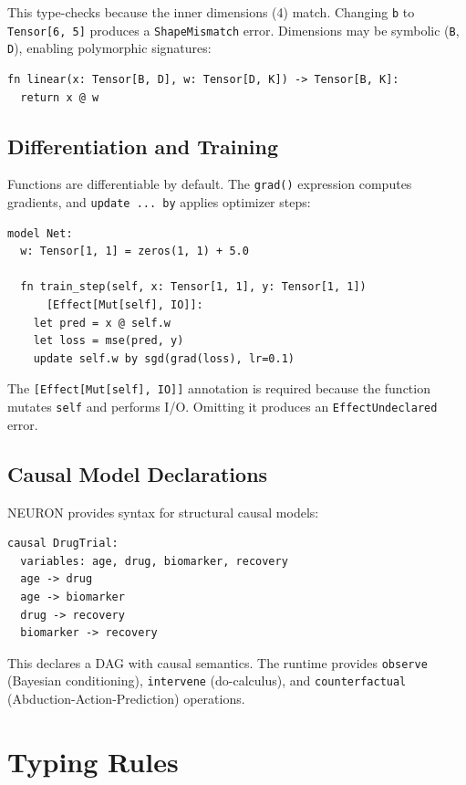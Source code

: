 \documentclass[11pt,a4paper]{article}
\newcommand{\ty}[1]{\texttt{#1}}
\begin{document}
This type-checks because the inner dimensions (4) match. Changing \ty{b} to \ty{Tensor[6, 5]} produces a \ty{ShapeMismatch} error. Dimensions may be symbolic (\ty{B}, \ty{D}), enabling polymorphic signatures:

\begin{lstlisting}
fn linear(x: Tensor[B, D], w: Tensor[D, K]) -> Tensor[B, K]:
  return x @ w
\end{lstlisting}

\subsection{Differentiation and Training}

Functions are differentiable by default. The \ty{grad()} expression computes gradients, and \ty{update ... by} applies optimizer steps:

\begin{lstlisting}
model Net:
  w: Tensor[1, 1] = zeros(1, 1) + 5.0

  fn train_step(self, x: Tensor[1, 1], y: Tensor[1, 1])
      [Effect[Mut[self], IO]]:
    let pred = x @ self.w
    let loss = mse(pred, y)
    update self.w by sgd(grad(loss), lr=0.1)
\end{lstlisting}

The \ty{[Effect[Mut[self], IO]]} annotation is required because the function mutates \ty{self} and performs I/O. Omitting it produces an \ty{EffectUndeclared} error.

\subsection{Causal Model Declarations}

NEURON provides syntax for structural causal models:

\begin{lstlisting}
causal DrugTrial:
  variables: age, drug, biomarker, recovery
  age -> drug
  age -> biomarker
  drug -> recovery
  biomarker -> recovery
\end{lstlisting}

This declares a DAG with causal semantics. The runtime provides \ty{observe} (Bayesian conditioning), \ty{intervene} (do-calculus), and \ty{counterfactual} (Abduction-Action-Prediction) operations.


\section{Typing Rules}
\end{document}
